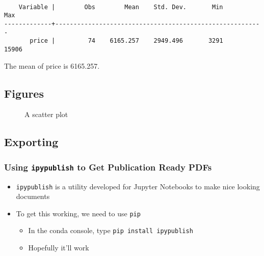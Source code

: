 \documentclass[10pt,parskip=half,
	toc=sectionentrywithdots,
	bibliography=totocnumbered,
	captions=tableheading,numbers=noendperiod]{scrartcl}
\providecommand{\tightlist}{%
  \setlength{\itemsep}{0pt}\setlength{\parskip}{0pt}}
\begin{document}
\begin{lstlisting}[language={},postbreak={},numbers=none,xrightmargin=7pt,belowskip=5pt,aboveskip=5pt,breakindent=0pt]

    Variable |        Obs        Mean    Std. Dev.       Min        Max
-------------+---------------------------------------------------------
       price |         74    6165.257    2949.496       3291      15906

\end{lstlisting}

The mean of price is 6165.257.

\hypertarget{figures}{%
\subsection{Figures}\label{figures}}

\begin{figure}[H]\begin{center}\end{center}\caption{A scatter plot}\label{fig:flabel}
    \end{figure}

\hypertarget{exporting}{%
\subsection{Exporting}\label{exporting}}

\hypertarget{using-ipypublish-to-get-publication-ready-pdfs}{%
\subsubsection{\texorpdfstring{Using \texttt{ipypublish} to Get
Publication Ready
PDFs}{Using ipypublish to Get Publication Ready PDFs}}\label{using-ipypublish-to-get-publication-ready-pdfs}}

\begin{itemize}
\tightlist
\item
  \texttt{ipypublish} is a utility developed for Jupyter Notebooks to
  make nice looking documents
\item
  To get this working, we need to use \texttt{pip}

  \begin{itemize}
  \tightlist
  \item
    In the conda console, type \texttt{pip\ install\ ipypublish}
  \item
    Hopefully it'll work
  \end{itemize}
\end{itemize}
\end{document}
